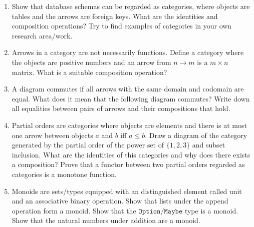 \documentclass{scrartcl}
\begin{document}
\begin{enumerate}

\item
  Show that database schemas can be regarded as categories, where
  objects are tables and the arrows are foreign keys.  What are the
  identities and composition operations?  Try to find examples of
  categories in your own research area/work.

\item \label{ex:matrix} Arrows in a category are not necessarily
  functions.  Define a category where the objects are positive numbers
  and an arrow from $n \rightarrow m$ is a $m \times n$ matrix.  What
  is a suitable composition operation?

\item
  A diagram commutes if all arrows with the same domain and codomain
  are equal.  What does it mean that the following diagram commutes?
  Write down all equalities between pairs of arrows and their
  compositions that hold.
  \begin{center}
  \end{center}

\item
  Partial orders are categories where objects are elements and there
  is at most one arrow between objects $a$ and $b$ iff $a \leq b$.
  Draw a diagram of the category generated by the partial order of the
  power set of $\{1,2,3\}$ and subset inclusion.  What are the
  identities of this categories and why does there exists a
  composition?  Prove that a functor between two partial orders
  regarded as categories is a monotone function.

\item
  Monoids are sets/types equipped with an distinguished element called
  unit and an associative binary operation.
  Show that lists under the append operation form a monoid.
  Show that the $\mathtt{Option}/\mathtt{Maybe}$ type is a monoid.
  Show that the natural numbers under addition are a monoid.


\end{enumerate}
\end{document}

